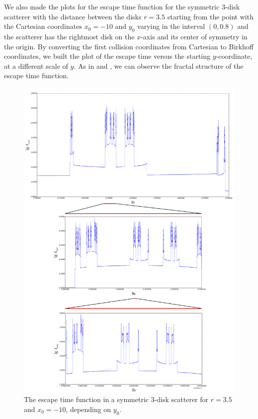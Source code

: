 \documentclass[pre, amsmath, amssymb, onecolumn, showpacs]{revtex4-1}
\begin{document}
We also made the plots for the escape time function for the symmetric 3-disk scatterer with the distance between the disks $r = 3.5$ starting from the point with the Cartesian coordinates $x_0 = -10$ and $y_0$ varying in the interval $(0, 0.8)$ and the scatterer has the rightmost disk on the $x$-axis and its center of symmetry in the origin. By converting the first collision coordinates from Cartesian to Birkhoff coordinates, we built the plot of the escape time versus the starting $y$-coordinate, at a different scale of $y$. As in \cite{gaspard2005chaos} and \cite{gaspard1989scattering}, we can observe the fractal structure of the escape time function.

\begin{figure}
\centering
\includegraphics*[width=470pt]{fractal-plot.png}
\caption{The escape time function in a symmetric 3-disk scatterer for $r = 3.5$ and $x_0 = -10$, depending on $y_0$. }
\label{fig02}
\end{figure}
\end{document}
